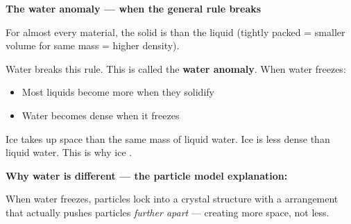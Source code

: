 \documentclass[11pt, a4paper]{article}
\newcommand{\blank}[1]{\underline{\hspace{#1}}}
\begin{document}
\medskip
\textbf{The water anomaly --- when the general rule breaks}

For almost every material, the solid is \blank{3cm} than the liquid (tightly packed = smaller volume for same mass = higher density).

Water breaks this rule. This is called the \textbf{water anomaly}. When water freezes:
\begin{itemize}[noitemsep, topsep=2pt]
  \item Most liquids become more \blank{2.5cm} when they solidify
  \item Water becomes \blank{2.5cm} dense when it freezes
\end{itemize}

Ice takes up \blank{2.5cm} space than the same mass of liquid water. Ice is less dense than liquid water. This is why ice \blank{2cm}.

\medskip
\textbf{Why water is different --- the particle model explanation:}

When water freezes, particles lock into a crystal structure with a \blank{3cm} arrangement that actually pushes particles \textit{further apart} --- creating more space, not less.
\end{document}
